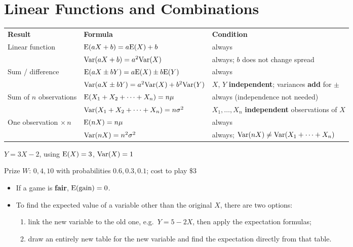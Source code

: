 \section{Linear Functions and Combinations}
\begin{center}\renewcommand{\arraystretch}{1.05}\small
\begin{tabular}{|M{4.0cm}|M{5.6cm}|L{5.6cm}|}\hline
\textbf{Result} & \textbf{Formula} & \textbf{Condition}\\\Xhline{2pt}
Linear function & $\mathrm{E}(aX+b)=a\mathrm{E}(X)+b$ & always\\\hline
 & $\mathrm{Var}(aX+b)=a^{2}\mathrm{Var}(X)$ & always; $b$ does not change spread\\\hline
Sum / difference & $\mathrm{E}(aX\pm bY)=a\mathrm{E}(X)\pm b\mathrm{E}(Y)$ & always\\\hline
 & $\mathrm{Var}(aX\pm bY)=a^{2}\mathrm{Var}(X)+b^{2}\mathrm{Var}(Y)$ & $X$, $Y$ \textbf{independent}; variances \textbf{add} for $\pm$\\\hline
Sum of $n$ observations & $\mathrm{E}(X_{1}+X_{2}+\cdots+X_{n})=n\mu$ & always (independence not needed)\\\hline
 & $\mathrm{Var}(X_{1}+X_{2}+\cdots+X_{n})=n\sigma^{2}$ & $X_{1},\dots,X_{n}$ \textbf{independent} observations of $X$\\\hline
One observation $\times\,n$ & $\mathrm{E}(nX)=n\mu$ & always\\\hline
 & $\mathrm{Var}(nX)=n^{2}\sigma^{2}$ & always; $\mathrm{Var}(nX)\neq\mathrm{Var}(X_{1}+\cdots+X_{n})$\\\hline
\end{tabular}\end{center}
\noindent\begin{minipage}[t]{0.48\textwidth}
\exlab $Y=3X-2$, using $\mathrm{E}(X)=3$, $\mathrm{Var}(X)=1$
\end{minipage}\hfill
\begin{minipage}[t]{0.48\textwidth}
\exlab Prize $W$: $0,4,10$ with probabilities $0.6,0.3,0.1$; cost to play $\$3$
\end{minipage}
\begin{info}[title=Note]
\begin{itemize}\setlength{\itemsep}{0pt}
\item If a game is \textbf{fair}, $\mathrm{E}(\text{gain})=0$.
\item To find the expected value of a variable other than the original $X$, there are two options:
\begin{enumerate}[label=(\arabic*),nosep]
\item link the new variable to the old one, e.g.\ $Y=5-2X$, then apply the expectation formulas;
\item draw an entirely new table for the new variable and find the expectation directly from that table.
\end{enumerate}
\end{itemize}
\end{info}

